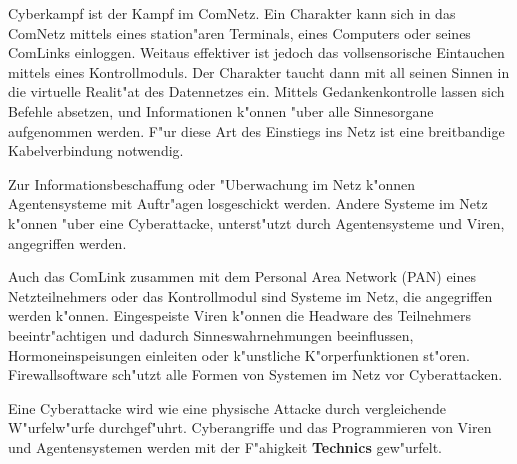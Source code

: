 Cyberkampf ist der Kampf im ComNetz. Ein Charakter kann sich in das ComNetz mittels eines station"aren Terminals, eines Computers oder seines ComLinks einloggen. Weitaus effektiver ist jedoch das vollsensorische Eintauchen mittels eines Kontrollmoduls. Der Charakter taucht dann mit all seinen Sinnen in die virtuelle Realit"at des Datennetzes ein. Mittels Gedankenkontrolle lassen sich Befehle absetzen, und Informationen k"onnen "uber alle Sinnesorgane aufgenommen werden. F"ur diese Art des Einstiegs ins Netz ist eine breitbandige Kabelverbindung notwendig.

Zur Informationsbeschaffung oder "Uberwachung im Netz k"onnen Agentensysteme mit Auftr"agen losgeschickt werden. Andere Systeme im Netz k"onnen "uber eine Cyberattacke, unterst"utzt durch Agentensysteme und Viren, angegriffen werden.

Auch das ComLink zusammen mit dem Personal Area Network (PAN) eines Netzteilnehmers oder das Kontrollmodul sind Systeme im Netz, die angegriffen werden k"onnen. Eingespeiste Viren k"onnen die Headware des Teilnehmers beeintr"achtigen und dadurch Sinneswahrnehmungen beeinflussen, Hormoneinspeisungen einleiten oder k"unstliche K"orperfunktionen st"oren. Firewallsoftware sch"utzt alle Formen von Systemen im Netz vor Cyberattacken.

Eine Cyberattacke wird wie eine physische Attacke durch vergleichende W"urfelw"urfe durchgef"uhrt. Cyberangriffe und das Programmieren von Viren und Agentensystemen werden mit der F"ahigkeit \textbf{Technics} gew"urfelt.
